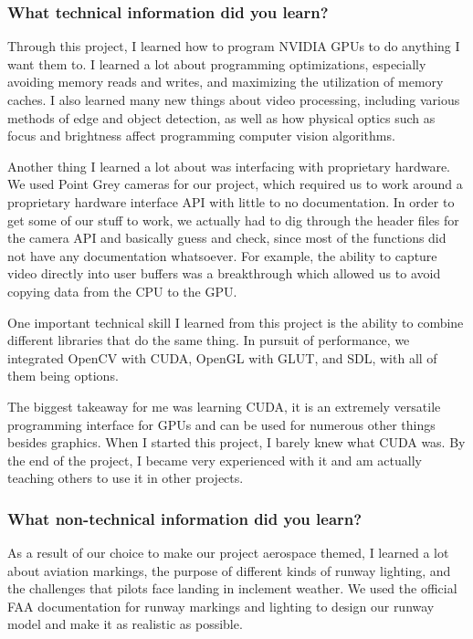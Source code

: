 \subsubsection{What technical information did you learn?}
Through this project, I learned how to program NVIDIA GPUs to do anything I want them to. I learned a lot about programming optimizations, especially avoiding memory reads and writes, and maximizing the utilization of memory caches. I also learned many new things about video processing, including various methods of edge and object detection, as well as how physical optics such as focus and brightness affect programming computer vision algorithms.
\par
Another thing I learned a lot about was interfacing with proprietary hardware. We used Point Grey cameras for our project, which required us to work around a proprietary hardware interface API with little to no documentation. In order to get some of our stuff to work, we actually had to dig through the header files for the camera API and basically guess and check, since most of the functions did not have any documentation whatsoever. For example, the ability to capture video directly into user buffers was a breakthrough which allowed us to avoid copying data from the CPU to the GPU. 
\par
One important technical skill I learned from this project is the ability to combine different libraries that do the same thing. In pursuit of performance, we integrated OpenCV with CUDA, OpenGL with GLUT, and SDL, with all of them being options.
\par  		
The biggest takeaway for me was learning CUDA, it is an extremely versatile programming interface for GPUs and can be used for numerous other things besides graphics. When I started this project, I barely knew what CUDA was. By the end of the project, I became very experienced with it and am actually teaching others to use it in other projects.\\

\subsubsection{What non-technical information did you learn?}
As a result of our choice to make our project aerospace themed, I learned a lot about aviation markings, the purpose of different kinds of runway lighting, and the challenges that pilots face landing in inclement weather. We used the official FAA documentation for runway markings and lighting to design our runway model and make it as realistic as possible.\\

